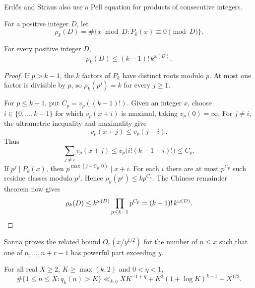 Erd\H{o}s and Straus \cite[p.~63]{ErdosStraus1977} also use a Pell equation
for products of consecutive integers.

For a positive integer $D$, let
\[
\rho_k(D)=\#\{x\bmod D:P_k(x)\equiv0\pmod D\}.
\]

\begin{lemma}\label{lem:block-roots}
For every positive integer $D$,
\[
\rho_k(D)\le(k-1)!\,k^{\omega(D)}.
\]
\end{lemma}

\begin{proof}
If $p>k-1$, the $k$ factors of $P_k$ have distinct roots modulo $p$.
At most one factor is divisible by $p$, so $\rho_k(p^j)=k$ for every
$j\ge1$.

For $p\le k-1$, put $C_p=v_p((k-1)!)$. Given an integer $x$, choose
$i\in\{0,\ldots,k-1\}$ for which $v_p(x+i)$ is maximal, taking
$v_p(0)=\infty$. For $j\ne i$, the ultrametric inequality and maximality
give
\[
v_p(x+j)\le v_p(j-i).
\]
Thus
\[
\sum_{j\ne i}v_p(x+j)
\le v_p\bigl(i!(k-1-i)!\bigr)\le C_p.
\]
If $p^j\mid P_k(x)$, then
$p^{\max(j-C_p,0)}\mid x+i$. For each $i$ there are at most $p^{C_p}$
such residue classes modulo $p^j$. Hence
$\rho_k(p^j)\le kp^{C_p}$. The Chinese remainder theorem now gives
\[
\rho_k(D)\le k^{\omega(D)}\prod_{p\le k-1}p^{C_p}
=(k-1)!\,k^{\omega(D)}.
\qedhere
\]
\end{proof}

Sanna \cite[Lemma~3.3]{Sanna2022} proves the related bound
$O_r(x/y^{1/2})$ for the number of $n\le x$ such that one of
$n,\ldots,n+r-1$ has powerful part exceeding $y$.

\begin{lemma}\label{lem:quotient-tail}
For all real $X\ge2$, $K\ge\max(k,2)$ and $0<\eta<1$,
\begin{equation}\label{eq:quotient-tail}
\#\{1\le n\le X:q_k(n)>K\}
\ll_{k,\eta}XK^{-1+\eta}
       +K^2(1+\log K)^{k-1}+X^{1/2}.
\end{equation}
\end{lemma}

